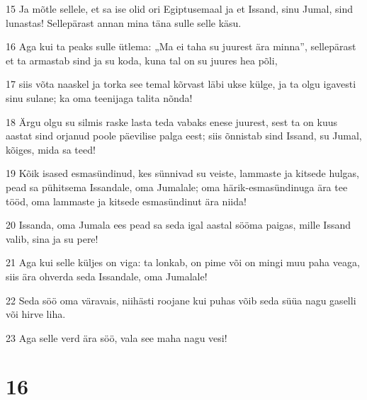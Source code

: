 \par 15 Ja mõtle sellele, et sa ise olid ori Egiptusemaal ja et Issand, sinu Jumal, sind lunastas! Sellepärast annan mina täna sulle selle käsu.
\par 16 Aga kui ta peaks sulle ütlema: „Ma ei taha su juurest ära minna”, sellepärast et ta armastab sind ja su koda, kuna tal on su juures hea põli,
\par 17 siis võta naaskel ja torka see temal kõrvast läbi ukse külge, ja ta olgu igavesti sinu sulane; ka oma teenijaga talita nõnda!
\par 18 Ärgu olgu su silmis raske lasta teda vabaks enese juurest, sest ta on kuus aastat sind orjanud poole päevilise palga eest; siis õnnistab sind Issand, su Jumal, kõiges, mida sa teed!
\par 19 Kõik isased esmasündinud, kes sünnivad su veiste, lammaste ja kitsede hulgas, pead sa pühitsema Issandale, oma Jumalale; oma härik-esmasündinuga ära tee tööd, oma lammaste ja kitsede esmasündinut ära niida!
\par 20 Issanda, oma Jumala ees pead sa seda igal aastal sööma paigas, mille Issand valib, sina ja su pere!
\par 21 Aga kui selle küljes on viga: ta lonkab, on pime või on mingi muu paha veaga, siis ära ohverda seda Issandale, oma Jumalale!
\par 22 Seda söö oma väravais, niihästi roojane kui puhas võib seda süüa nagu gaselli või hirve liha.
\par 23 Aga selle verd ära söö, vala see maha nagu vesi!

\chapter{16}

